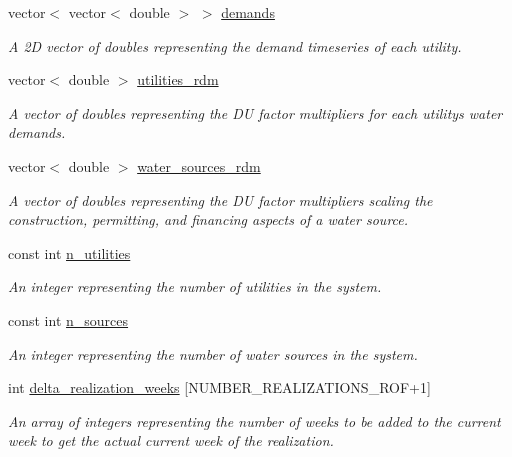 \begin{DoxyCompactItemize}
vector$<$ vector$<$ double $>$ $>$ \mbox{\hyperlink{classContinuityModel_a1994ed4d99e0583eac5c82a4b26d9728}{demands}}
\begin{DoxyCompactList}\small\item\em A 2D vector of doubles representing the demand timeseries of each utility. \end{DoxyCompactList}\item 
vector$<$ double $>$ \mbox{\hyperlink{classContinuityModel_aa4a00b76da6295d2faa11e3dcaea1896}{utilities\+\_\+rdm}}
\begin{DoxyCompactList}\small\item\em A vector of doubles representing the DU factor multipliers for each utility\textquotesingle{}s water demands. \end{DoxyCompactList}\item 
vector$<$ double $>$ \mbox{\hyperlink{classContinuityModel_ab7b8fa93a6f56b328e425e1ead6cfefa}{water\+\_\+sources\+\_\+rdm}}
\begin{DoxyCompactList}\small\item\em A vector of doubles representing the DU factor multipliers scaling the construction, permitting, and financing aspects of a water source. \end{DoxyCompactList}\item 
const int \mbox{\hyperlink{classContinuityModel_a6df6198ebc99a099df08f4b8ce6b52b9}{n\+\_\+utilities}}
\begin{DoxyCompactList}\small\item\em An integer representing the number of utilities in the system. \end{DoxyCompactList}\item 
const int \mbox{\hyperlink{classContinuityModel_a3c25a0d17579eb0fdad0b18319441460}{n\+\_\+sources}}
\begin{DoxyCompactList}\small\item\em An integer representing the number of water sources in the system. \end{DoxyCompactList}\item 
int \mbox{\hyperlink{classContinuityModel_aee4088e422a0d3723dc7895c96c9ebe3}{delta\+\_\+realization\+\_\+weeks}} \mbox{[}N\+U\+M\+B\+E\+R\+\_\+\+R\+E\+A\+L\+I\+Z\+A\+T\+I\+O\+N\+S\+\_\+\+R\+OF+1\mbox{]}
\begin{DoxyCompactList}\small\item\em An array of integers representing the number of weeks to be added to the current week to get the actual current week of the realization. \end{DoxyCompactList}\end{DoxyCompactItemize}



